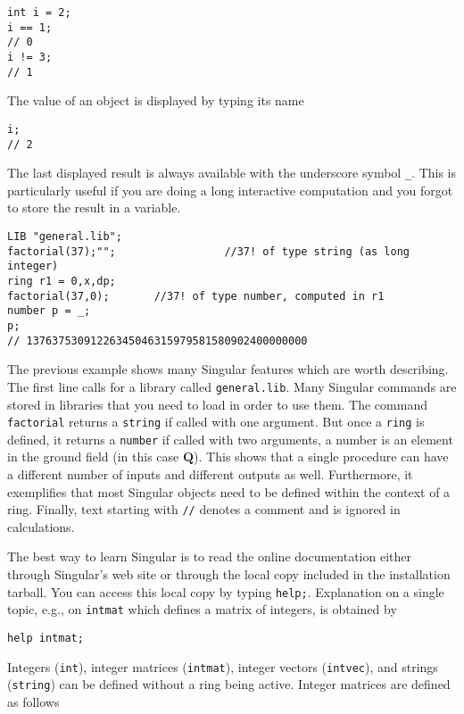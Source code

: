 \documentclass[12pt]{amsart}
\begin{document}
\begin{verbatim}
int i = 2;
i == 1;
// 0
i != 3;
// 1
\end{verbatim}

The value of an object is displayed by typing its name

\begin{verbatim}
i;
// 2
\end{verbatim}


The last displayed result is always available with the underscore symbol \verb+_+. This is particularly useful
if you are doing a long interactive computation and you forgot to store the result in a variable.

\begin{verbatim}
LIB "general.lib";
factorial(37);"";                 //37! of type string (as long integer)
ring r1 = 0,x,dp;
factorial(37,0);       //37! of type number, computed in r1
number p = _;
p;
// 13763753091226345046315979581580902400000000
\end{verbatim}   

The previous example shows many Singular features which are worth describing. The first line calls for a library
called \texttt{general.lib}. Many Singular commands are stored in libraries that you need to load in order
to use them. The command \texttt{factorial} returns a \texttt{string} if called with one argument. But once 
a \texttt{ring} is defined, it returns a \texttt{number} if called with two arguments, a number is an element in the ground field (in this case $\mathbf{Q}$).
This shows that a single procedure
can have a different number of inputs and different outputs as well. Furthermore, it exemplifies that most Singular objects
need to be defined within the context of a  ring. Finally,
text starting with \verb+//+ denotes a comment and is ignored in calculations.

The best way to learn Singular is to read the online documentation either through Singular's web site or 
through the local copy included in the installation tarball. You can access this local copy by typing
\verb|help;|. Explanation on a single topic, e.g., on \texttt{intmat} which defines a matrix of integers, is
obtained by

\begin{verbatim}
help intmat;
\end{verbatim} 

Integers (\texttt{int}), integer matrices (\texttt{intmat}), integer vectors (\texttt{intvec}), 
and strings (\texttt{string}) can be defined without a ring being active. Integer matrices are defined as follows
\end{document}
